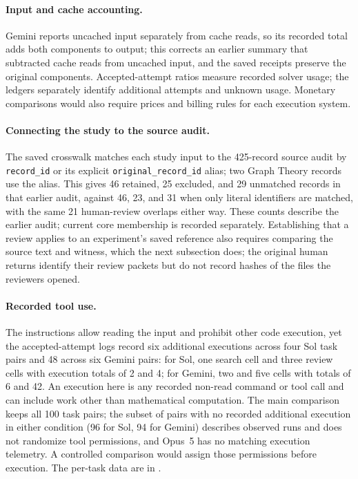 \paragraph{Input and cache accounting.}
Gemini reports uncached input separately from cache reads, so its recorded total adds both components to output; this corrects an earlier summary that subtracted cache reads from uncached input, and the saved receipts preserve the original components. Accepted-attempt ratios measure recorded solver usage; the ledgers separately identify additional attempts and unknown usage. Monetary comparisons would also require prices and billing rules for each execution system.

\paragraph{Connecting the study to the source audit.}
The saved crosswalk matches each study input to the 425-record source audit by \texttt{record\_id} or its explicit \texttt{original\_record\_id} alias; two Graph Theory records use the alias. This gives 46 retained, 25 excluded, and 29 unmatched records in that earlier audit, against 46, 23, and 31 when only literal identifiers are matched, with the same 21 human-review overlaps either way. These counts describe the earlier audit; current core membership is recorded separately. Establishing that a review applies to an experiment's saved reference also requires comparing the source text and witness, which the next subsection does; the original human returns identify their review packets but do not record hashes of the files the reviewers opened.

\paragraph{Recorded tool use.}
The instructions allow reading the input and prohibit other code execution, yet the accepted-attempt logs record six additional executions across four Sol task pairs and 48 across six Gemini pairs: for Sol, one search cell and three review cells with execution totals of 2 and 4; for Gemini, two and five cells with totals of 6 and 42. An execution here is any recorded non-read command or tool call and can include work other than mathematical computation. The main comparison keeps all 100 task pairs; the subset of pairs with no recorded additional execution in either condition (96 for Sol, 94 for Gemini) describes observed runs and does not randomize tool permissions, and Opus~5 has no matching execution telemetry. A controlled comparison would assign those permissions before execution. The per-task data are in .

